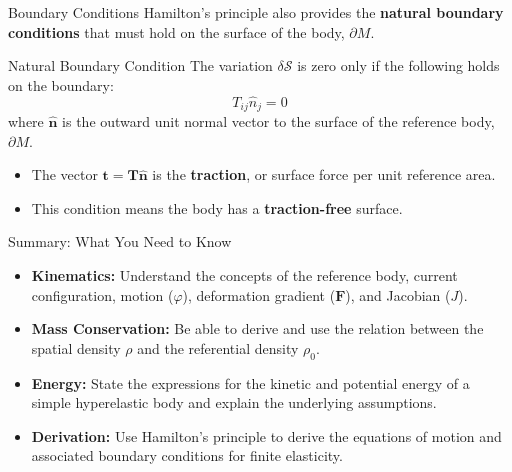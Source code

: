 \documentclass{beamer}
\begin{document}
\begin{frame}{Boundary Conditions}
    Hamilton's principle also provides the \textbf{natural boundary conditions} that must hold on the surface of the body, $\partial M$.
    
    \begin{block}{Natural Boundary Condition}
        The variation $\delta\mathcal{S}$ is zero only if the following holds on the boundary:
        $$ T_{ij} \hat{n}_j = 0 $$
        where $\hat{\mathbf{n}}$ is the outward unit normal vector to the surface of the reference body, $\partial M$.
    \end{block}
    \pause
    
    \begin{itemize}
        \item The vector $\mathbf{t} = \mathbf{T}\hat{\mathbf{n}}$ is the \textbf{traction}, or surface force per unit reference area.
        \item This condition means the body has a \textbf{traction-free} surface.
    \end{itemize}
\end{frame}


\begin{frame}{Summary: What You Need to Know}
    \begin{itemize}
        \item \textbf{Kinematics:} Understand the concepts of the reference body, current configuration, motion ($\varphi$), deformation gradient ($\mathbf{F}$), and Jacobian ($J$).
        \pause
        \item \textbf{Mass Conservation:} Be able to derive and use the relation between the spatial density $\rho$ and the referential density $\rho_0$.
        \pause
        \item \textbf{Energy:} State the expressions for the kinetic and potential energy of a simple hyperelastic body and explain the underlying assumptions.
        \pause
        \item \textbf{Derivation:} Use Hamilton's principle to derive the equations of motion and associated boundary conditions for finite elasticity.
    \end{itemize}
\end{frame}
\end{document}
